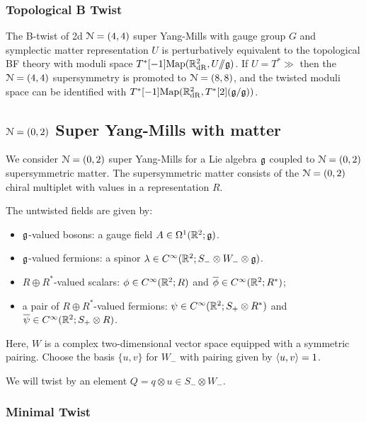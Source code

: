 \documentclass[10pt, oneside]{article}
\newcommand{\ham}{/\!\!/}
\begin{document}
\subsubsection{Topological B Twist} \label{sect:2d44Btwist}

\begin{theorem}
The B-twist of 2d $\mathcal{N}=(4,4)$ super Yang-Mills with gauge group $G$ and symplectic matter representation $U$ is perturbatively equivalent to the topological BF theory with moduli space $T^*[-1]\mr{Map}(\RR^2_{\mr{dR}}, U \ham \gg)$.  If $U = T^*\gg$ then the $\mathcal{N}=(4,4)$ supersymmetry is promoted to $\mathcal{N}=(8,8)$, and the twisted moduli space can be identified with $T^*[-1]\mathrm{Map}(\mathbb R^2_{\mathrm{dR}}, T^*[2](\mathfrak{g}/\mathfrak{g}))$.
\end{theorem}

\subsection{\texorpdfstring{$\mathcal N=(0,2)$}{N=(0,2)} Super Yang-Mills with matter} \label{sect:2d(0,2)}

We consider $\mathcal N=(0,2)$ super Yang-Mills for a Lie algebra $\mathfrak g$ coupled to $\mathcal N=(0,2)$ supersymmetric matter. 
The supersymmetric matter consists of the $\mathcal N = (0,2)$ chiral multiplet with values in a representation $R$. 


The untwisted fields are given by:
\begin{itemize}
\item $\mathfrak g$-valued bosons: a gauge field $A \in \Omega^1(\mathbb R^2;\mathfrak g)$.
\item $\mathfrak g$-valued fermions: a spinor $\lambda \in C^\infty(\mathbb R^2 ; S_- \otimes W_- \otimes \mathfrak g)$. 
\item $R \oplus R^*$-valued scalars: $\phi \in C^\infty(\mathbb R^2 ; R)$ and $\overline{\phi} \in C^\infty(\mathbb R^2 ; R^*)$;
\item a pair of $R \oplus R^*$-valued fermions: $\psi \in C^\infty(\mathbb R^2 ; S_+ \otimes R^*)$  and $\overline{\psi} \in C^\infty(\mathbb R^2 ; S_+ \otimes R)$.
\end{itemize}
Here, $W$ is a complex two-dimensional vector space equipped with a symmetric pairing. 
Choose the basis $\{u,v\}$ for $W_-$ with pairing given by $\langle u, v\rangle = 1$. 

We will twist by an element $Q = q \otimes u \in S_- \otimes W_-$. 

\subsubsection{Minimal Twist} \label{sect:2d02minimaltwist}
\end{document}
